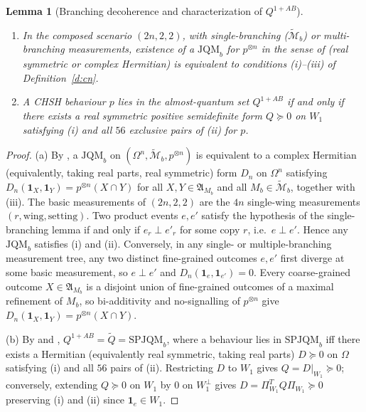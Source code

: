 \documentclass[11pt,a4paper]{article}
\newtheorem{lemma}[theorem]{Lemma}
\theoremstyle{definition}
\theoremstyle{remark}
\newcommand{\ind}[1]{\mathbf{1}_{#1}}
\newcommand{\JQMb}{\mathrm{JQM}_b}
\newcommand{\SPJQMb}{\mathrm{SPJQM}_b}
\newcommand{\QAB}{Q^{1+AB}}
\begin{document}
\begin{lemma}[Branching decoherence and characterization of $\QAB$]\label{l:branch-ii}\leavevmode
\begin{enumerate}
  \item[(a)] In the composed scenario $(2n, 2, 2)$, with single-branching ($\widetilde{\mathcal{M}}_b$) or multi-branching measurements, existence of a $\JQMb$ for $p^{\otimes n}$ in the sense of \cite{DHW} (real symmetric or complex Hermitian) is equivalent to conditions (i)--(iii) of Definition~\ref{d:cn}.
  \item[(b)] A CHSH behaviour $p$ lies in the almost-quantum set $\QAB$ if and only if there exists a real symmetric positive semidefinite form $Q \succeq 0$ on $W_1$ satisfying (i) and all $56$ exclusive pairs of (ii) for $p$.
\end{enumerate}
\end{lemma}

\begin{proof}
(a) By \cite[Lemma~8]{DHW}, a $\JQMb$ on $(\Omega^n, \widetilde{\mathcal{M}}_b, p^{\otimes n})$ is equivalent to a complex Hermitian (equivalently, taking real parts, real symmetric) form $D_n$ on $\Omega^n$ satisfying $D_n(\ind X, \ind Y) = p^{\otimes n}(X \cap Y)$ for all $X, Y \in \mathfrak{A}_{M_b}$ and all $M_b \in \widetilde{\mathcal{M}}_b$, together with (iii). The basic measurements of $(2n, 2, 2)$ are the $4n$ single-wing measurements $(r, \text{wing}, \text{setting})$. Two product events $e, e'$ satisfy the hypothesis of the single-branching lemma \cite[Lemma~17]{DHW} if and only if $e_r \perp e'_r$ for some copy $r$, i.e.\ $e \perp e'$. Hence any $\JQMb$ satisfies (i) and (ii). Conversely, in any single- or multiple-branching measurement tree, any two distinct fine-grained outcomes $e, e'$ first diverge at some basic measurement, so $e \perp e'$ and $D_n(\ind e, \ind{e'}) = 0$. Every coarse-grained outcome $X \in \mathfrak{A}_{M_b}$ is a disjoint union of fine-grained outcomes of a maximal refinement of $M_b$, so bi-additivity and no-signalling of $p^{\otimes n}$ give $D_n(\ind X, \ind Y) = p^{\otimes n}(X \cap Y)$.

(b) By \cite[Definition~19 and Theorem~21]{DHW} and \cite[Lemma~3]{NGHA}, $\QAB = \tilde{Q} = \SPJQMb$, where a behaviour lies in $\SPJQMb$ iff there exists a Hermitian (equivalently real symmetric, taking real parts) $D \succeq 0$ on $\Omega$ satisfying (i) and all $56$ pairs of (ii). Restricting $D$ to $W_1$ gives $Q = D|_{W_1} \succeq 0$; conversely, extending $Q \succeq 0$ on $W_1$ by $0$ on $W_1^\perp$ gives $D = \Pi_{W_1}^T Q \Pi_{W_1} \succeq 0$ preserving (i) and (ii) since $\ind e \in W_1$.
\end{proof}
\end{document}
